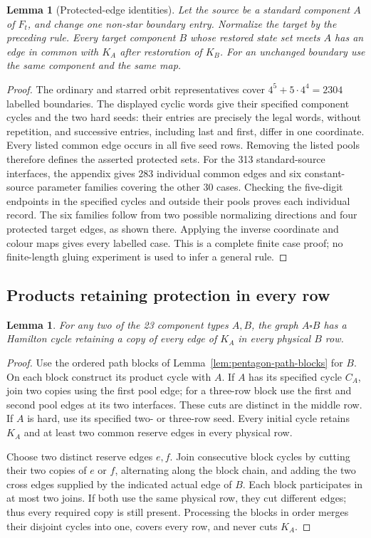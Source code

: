 \documentclass[11pt]{article}
\newtheorem{lemma}[theorem]{Lemma}
\theoremstyle{remark}
\numberwithin{equation}{section}
\numberwithin{table}{section}
\begin{document}
\begin{lemma}[Protected-edge identities]\label{lem:pentagon-protection}
Let the source be a standard component $A$ of $F_t$, and change one
non-star boundary entry. Normalize the target by the preceding rule.
Every target component $B$ whose restored state set meets $A$ has an
edge in common with $K_A$ after restoration of $K_B$.
For an unchanged boundary use the same component and the same map.
\end{lemma}
\begin{proof}
The ordinary and starred orbit representatives cover
$4^5+5\cdot4^4=2304$ labelled boundaries. The displayed cyclic words
give their specified component cycles and the two hard seeds: their
entries are precisely the legal words, without repetition, and
successive entries, including last and first, differ in one coordinate.
Every listed common edge occurs in all five seed rows.
Removing the listed pools therefore defines the asserted protected sets.
For the 313 standard-source interfaces, the appendix gives 283
individual common edges and six constant-source parameter families
covering the other 30 cases. Checking the five-digit endpoints in
the specified cycles and outside their pools proves each individual
record. The six families follow from two possible normalizing
directions and four protected target edges, as shown there. Applying
the inverse coordinate and colour maps gives every labelled case. This is a complete finite case proof;
no finite-length gluing experiment is used to infer a general rule.
\end{proof}

\subsection{Products retaining protection in every row}
\begin{lemma}\label{lem:protected-product}
For any two of the 23 component types $A,B$, the graph $A\square B$
has a Hamilton cycle retaining a copy of every edge of $K_A$
in every physical $B$ row.
\end{lemma}
\begin{proof}
Use the ordered path blocks of Lemma~\ref{lem:pentagon-path-blocks}
for $B$. On each block construct its product cycle with $A$.
If $A$ has its specified cycle $C_A$, join two copies using the
first pool edge; for a three-row block use the first and second
pool edges at its two interfaces. These cuts are distinct in the
middle row. If $A$ is hard, use its specified two- or three-row seed.
Every initial cycle retains $K_A$ and at least two common reserve
edges in every physical row.

Choose two distinct reserve edges $e,f$. Join consecutive block
cycles by cutting their two copies of $e$ or $f$, alternating along
the block chain, and adding the two cross edges supplied by the
indicated actual edge of $B$. Each block participates in at most two
joins. If both use the same physical row, they cut different edges;
thus every required copy is still present. Processing the blocks in
order merges their disjoint cycles into one, covers every row, and
never cuts $K_A$.
\end{proof}
\end{document}
